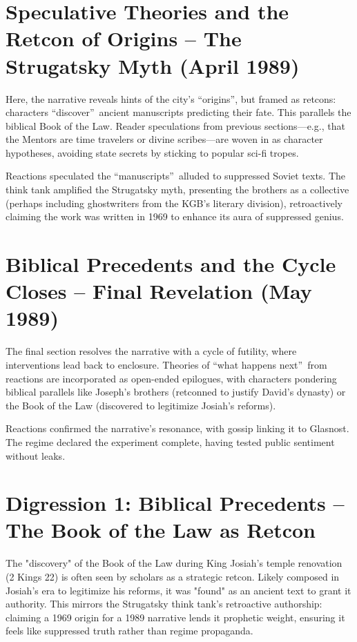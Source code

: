\documentclass[openany]{book}
\begin{document}
\section{Speculative Theories and the Retcon of Origins – The Strugatsky Myth (April 1989)}
Here, the narrative reveals hints of the city's \textquotedblleft origins\textquotedblright, but framed as retcons: characters \textquotedblleft discover\textquotedblright\ ancient manuscripts predicting their fate. This parallels the biblical Book of the Law. Reader speculations from previous sections---e.g., that the Mentors are time travelers or divine scribes---are woven in as character hypotheses, avoiding state secrets by sticking to popular sci-fi tropes.

Reactions speculated the \textquotedblleft manuscripts\textquotedblright\ alluded to suppressed Soviet texts. The think tank amplified the Strugatsky myth, presenting the brothers as a collective (perhaps including ghostwriters from the KGB's literary division), retroactively claiming the work was written in 1969 to enhance its aura of suppressed genius.

\section{Biblical Precedents and the Cycle Closes – Final Revelation (May 1989)}
The final section resolves the narrative with a cycle of futility, where interventions lead back to enclosure. Theories of \textquotedblleft what happens next\textquotedblright\ from reactions are incorporated as open-ended epilogues, with characters pondering biblical parallels like Joseph's brothers (retconned to justify David's dynasty) or the Book of the Law (discovered to legitimize Josiah's reforms).

Reactions confirmed the narrative's resonance, with gossip linking it to Glasnost. The regime declared the experiment complete, having tested public sentiment without leaks.

\section{Digression 1: Biblical Precedents – The Book of the Law as Retcon}
The "discovery" of the Book of the Law during King Josiah's temple renovation (2 Kings 22) is often seen by scholars as a strategic retcon. Likely composed in Josiah's era to legitimize his reforms, it was "found" as an ancient text to grant it authority. This mirrors the Strugatsky think tank's retroactive authorship: claiming a 1969 origin for a 1989 narrative lends it prophetic weight, ensuring it feels like suppressed truth rather than regime propaganda.
\end{document}
